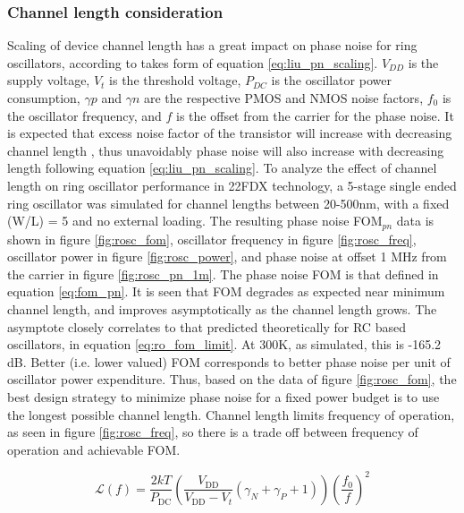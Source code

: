 \subsubsection{Channel length consideration}\label{sec:chan_len_22fdx}
	Scaling of device channel length has a great impact on phase noise for ring oscillators, according to \cite{Liu2020} takes form of equation \ref{eq:liu_pn_scaling}. $V_{DD}$ is the supply voltage, $V_t$ is the threshold voltage, $P_{DC}$ is the oscillator power consumption, $\gamma p$ and $\gamma n$ are the respective PMOS and NMOS noise factors, $f_0$ is the oscillator frequency, and $f$ is the offset from the carrier for the phase noise. It is expected that excess noise factor of the transistor will increase with decreasing channel length \cite{Antonopoulos2013}, thus unavoidably phase noise will also increase with decreasing length following equation \ref{eq:liu_pn_scaling}. To analyze the effect of channel length on ring oscillator performance in 22FDX technology, a 5-stage single ended ring oscillator was simulated for channel lengths between 20-500nm, with a fixed (W/L) = 5 and no external loading. The resulting phase noise FOM$_{pn}$ data is shown in figure \ref{fig:rosc_fom}, oscillator frequency in figure \ref{fig:rosc_freq}, oscillator power in figure \ref{fig:rosc_power}, and phase noise at offset 1 MHz from the carrier in figure \ref{fig:rosc_pn_1m}. The phase noise FOM is that defined in equation \ref{eq:fom_pn}. It is seen that FOM degrades as expected near minimum channel length, and improves asymptotically as the channel length grows. The asymptote closely correlates to that predicted theoretically for RC based oscillators, in equation \ref{eq:ro_fom_limit}. At 300K, as simulated, this is -165.2 dB. Better (i.e. lower valued) FOM corresponds to better phase noise per unit of oscillator power expenditure. Thus, based on the data of figure \ref{fig:rosc_fom}, the best design strategy to minimize phase noise for a fixed power budget is to use the longest possible channel length. Channel length limits frequency of operation, as seen in figure \ref{fig:rosc_freq}, so there is a trade off between frequency of operation and achievable FOM. 

	\begin{equation} \label{eq:liu_pn_scaling}
		\mathcal {L}(f) =\frac {2kT}{P_{\textrm {DC}}}\left ({\frac {V_{\textrm {DD}}}{V_{\textrm {DD}}-V_{t}} (\gamma _{N}+\gamma _{P}+1)}\right)\left ({\frac {f_{0}}{f}}\right)^{2}
	\end{equation}

